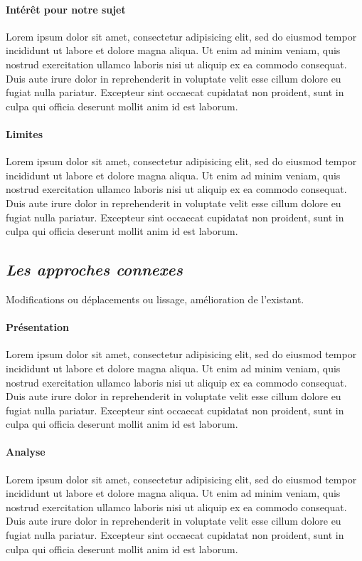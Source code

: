 \documentclass[11pt, french]{report-rd-info}
\begin{document}
\paragraph{Intérêt pour notre sujet }
Lorem ipsum dolor sit amet, consectetur adipisicing elit, sed do eiusmod tempor incididunt ut labore et dolore magna aliqua. Ut enim ad minim veniam, quis nostrud exercitation ullamco laboris nisi ut aliquip ex ea commodo consequat. Duis aute irure dolor in reprehenderit in voluptate velit esse cillum dolore eu fugiat nulla pariatur. Excepteur sint occaecat cupidatat non proident, sunt in culpa qui officia deserunt mollit anim id est laborum.

\paragraph{Limites }
Lorem ipsum dolor sit amet, consectetur adipisicing elit, sed do eiusmod tempor incididunt ut labore et dolore magna aliqua. Ut enim ad minim veniam, quis nostrud exercitation ullamco laboris nisi ut aliquip ex ea commodo consequat. Duis aute irure dolor in reprehenderit in voluptate velit esse cillum dolore eu fugiat nulla pariatur. Excepteur sint occaecat cupidatat non proident, sunt in culpa qui officia deserunt mollit anim id est laborum.

\subsection{\emph{Les approches connexes}} 
Modifications ou déplacements ou lissage, amélioration de l’existant.

\paragraph{Présentation }
Lorem ipsum dolor sit amet, consectetur adipisicing elit, sed do eiusmod tempor incididunt ut labore et dolore magna aliqua. Ut enim ad minim veniam, quis nostrud exercitation ullamco laboris nisi ut aliquip ex ea commodo consequat. Duis aute irure dolor in reprehenderit in voluptate velit esse cillum dolore eu fugiat nulla pariatur. Excepteur sint occaecat cupidatat non proident, sunt in culpa qui officia deserunt mollit anim id est laborum.

\paragraph{Analyse }
Lorem ipsum dolor sit amet, consectetur adipisicing elit, sed do eiusmod tempor incididunt ut labore et dolore magna aliqua. Ut enim ad minim veniam, quis nostrud exercitation ullamco laboris nisi ut aliquip ex ea commodo consequat. Duis aute irure dolor in reprehenderit in voluptate velit esse cillum dolore eu fugiat nulla pariatur. Excepteur sint occaecat cupidatat non proident, sunt in culpa qui officia deserunt mollit anim id est laborum.
\end{document}
